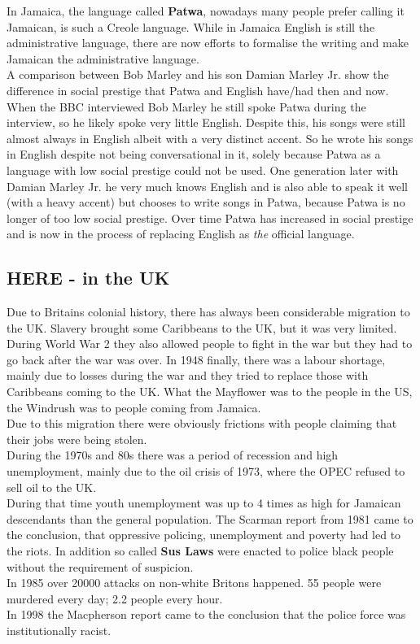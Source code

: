 \documentclass{article}
\begin{document}
	In Jamaica, the language called \textbf{Patwa}, nowadays many people prefer calling it Jamaican, is such a Creole language. While in Jamaica English is still the administrative language, there are now efforts to formalise the writing and make Jamaican the administrative language. \\
	A comparison between Bob Marley and his son Damian Marley Jr. show the difference in social prestige that Patwa and English have/had then and now. When the BBC interviewed Bob Marley he still spoke Patwa during the interview, so he likely spoke very little English. Despite this, his songs were still almost always in English albeit with a very distinct accent. So he wrote his songs in English despite not being conversational in it, solely because Patwa as a language with low social prestige could not be used. One generation later with Damian Marley Jr. he very much knows English and is also able to speak it well (with a heavy accent) but chooses to write songs in Patwa, because Patwa is no longer of too low social prestige. Over time Patwa has increased in social prestige and is now in the process of replacing English as \textit{the} official language.

	\subsection{HERE - in the UK}
	Due to Britains colonial history, there has always been considerable migration to the UK. Slavery brought some Caribbeans to the UK, but it was very limited. During World War 2 they also allowed people to fight in the war but they had to go back after the war was over. In 1948 finally, there was a labour shortage, mainly due to losses during the war and they tried to replace those with Caribbeans coming to the UK. What the Mayflower was to the people in the US, the Windrush was to people coming from Jamaica. \\
	Due to this migration there were obviously frictions with people claiming that their jobs were being stolen. \\
	During the 1970s and 80s there was a period of recession and high unemployment, mainly due to the oil crisis of 1973, where the OPEC refused to sell oil to the UK. \\
	During that time youth unemployment was up to 4 times as high for Jamaican descendants than the general population. The Scarman report from 1981 came to the conclusion, that oppressive policing, unemployment and poverty had led to the riots. In addition so called \textbf{Sus Laws} were enacted to police black people without the requirement of suspicion. \\
	In 1985 over 20000 attacks on non-white Britons happened. 55 people were murdered every day; 2.2 people every hour. \\
	In 1998 the Macpherson report came to the conclusion that the police force was institutionally racist. \\
\end{document}
